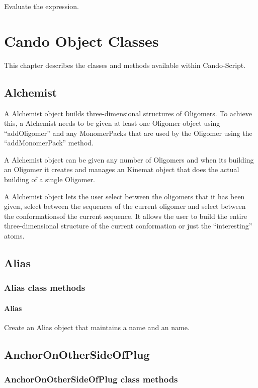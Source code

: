 \begin{itemize}
  Evaluate the expression.

\chapter{Cando Object Classes}

This chapter describes the classes and methods available within Cando-Script.

\section{Alchemist}

  A Alchemist object builds three-dimensional structures of Oligomers. To achieve this, a Alchemist needs to be given at least one Oligomer object using ``addOligomer'' and any MonomerPacks that are used by the Oligomer using the ``addMonomerPack'' method.

  A Alchemist object can be given any number of Oligomers and when its building an Oligomer it creates and manages an Kinemat object that does the actual building of a single Oligomer.

  A Alchemist object lets the user select between the oligomers that it has been given, select between the sequences of the current oligomer and select between the conformationsof the current sequence. It allows the user to build the entire three-dimensional structure of the current conformation or just the ``interesting'' atoms.

\section{Alias}
\subsection{Alias class methods}
\subsubsection{Alias}

Create an Alias object that maintains a  name and an  name.

\section{AnchorOnOtherSideOfPlug}
\subsection{AnchorOnOtherSideOfPlug class methods}

\end{itemize}
